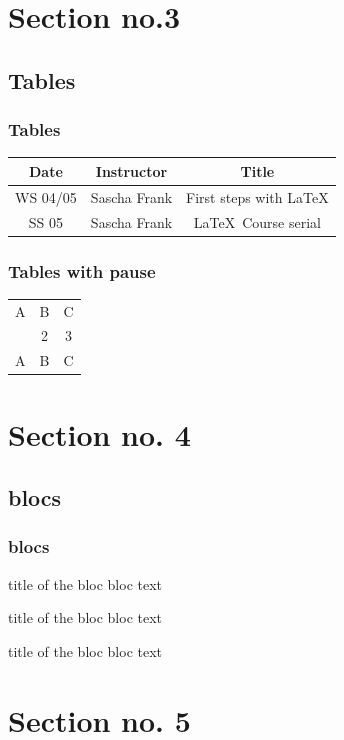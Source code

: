 \documentclass{beamer}
\begin{document}
\section{Section no.3} 
\subsection{Tables}
\begin{frame}\frametitle{Tables}
\begin{tabular}{|c|c|c|}
\hline
\textbf{Date} & \textbf{Instructor} & \textbf{Title} \\
\hline
WS 04/05 & Sascha Frank & First steps with  \LaTeX  \\
\hline
SS 05 & Sascha Frank & \LaTeX \ Course serial \\
\hline
\end{tabular}
\end{frame}


\begin{frame}\frametitle{Tables with pause}
\begin{tabular}{c c c}
A & B & C \\ 
\pause 
1 & 2 & 3 \\  
\pause 
A & B & C \\ 
\end{tabular} 
\end{frame}


\section{Section no. 4}
\subsection{blocs}
\begin{frame}\frametitle{blocs}

\begin{block}{title of the bloc}
bloc text
\end{block}

\begin{exampleblock}{title of the bloc}
bloc text
\end{exampleblock}


\begin{alertblock}{title of the bloc}
bloc text
\end{alertblock}
\end{frame}

\section{Section no. 5}
\end{document}
